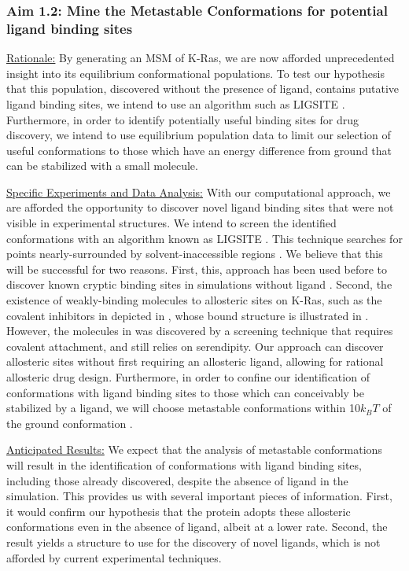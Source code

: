 \documentclass[12pt]{article}
\begin{document}
  \subsubsection*{Aim 1.2: Mine the Metastable Conformations for potential ligand binding sites}
  
  \underline{Rationale:} By generating an MSM of K-Ras, we are now afforded unprecedented insight into its equilibrium conformational populations. To test our hypothesis that this population, discovered without the presence of ligand, contains putative ligand binding sites, we intend to use an algorithm such as LIGSITE \cite{hendlich1997}. Furthermore, in order to identify potentially useful binding sites for drug discovery, we intend to use equilibrium population data to limit our selection of useful conformations to those which have an energy difference from ground that can be stabilized with a small molecule.\cite{kuntz1999}
  
  
  \underline{Specific Experiments and Data Analysis:} With our computational approach, we are afforded the opportunity to discover novel ligand binding sites that were not visible in experimental structures. We intend to screen the identified conformations with an algorithm known as LIGSITE \cite{hendlich1997}. This technique searches for points nearly-surrounded by solvent-inaccessible regions \cite{hendlich1997}. We believe that this will be successful for two reasons. First, this, approach has been used before to discover known cryptic binding sites in simulations without ligand \cite{bowman2012}. Second, the existence of weakly-binding molecules to allosteric sites on K-Ras, such as the covalent inhibitors in \cite{ostrem2013} depicted in , whose bound structure is illustrated in . However, the molecules in \cite{ostrem2013} was discovered by a screening technique \cite{tethering} that requires covalent attachment, and still relies on serendipity. Our approach can discover allosteric sites without first requiring an allosteric ligand, allowing for rational allosteric drug design. Furthermore, in order to confine our identification of conformations with ligand binding sites to those which can conceivably be stabilized by a ligand, we will choose metastable conformations within 10$k_BT$ of the ground conformation \cite{kuntz1999}.
  
 \underline{Anticipated Results:} We expect that the analysis of metastable conformations will result in the identification of conformations with ligand binding sites, including those already discovered, despite the absence of ligand in the simulation. This provides us with several important pieces of information. First, it would confirm our hypothesis that the protein adopts these allosteric conformations even in the absence of ligand, albeit at a lower rate. Second, the result yields a structure to use for the discovery of novel ligands, which is not afforded by current experimental techniques.
 
\end{document}
